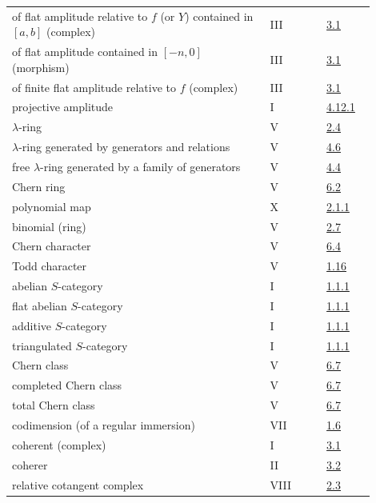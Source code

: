 \begin{longtable}{@{}>{\raggedright\arraybackslash}p{0.64\linewidth}>{\raggedright\arraybackslash}p{0.14\linewidth}>{\raggedright\arraybackslash}p{0.12\linewidth}@{}}
of flat amplitude relative to \(f\) (or \(Y\)) contained in \([a,b]\) (complex) & III & \hyperlink{sga6.e03.def.3-1}{3.1}\\
of flat amplitude contained in \([-n,0]\) (morphism) & III & \hyperlink{sga6.e03.def.3-1}{3.1}\\
of finite flat amplitude relative to \(f\) (complex) & III & \hyperlink{sga6.e03.def.3-1}{3.1}\\
projective amplitude & I & \hyperlink{sga6.e01.rem.4-12-1}{4.12.1}\\
\(\lambda\)-ring & V & \hyperlink{sga6.e05.def.2-4}{2.4}\\
\(\lambda\)-ring generated by generators and relations & V & \hyperlink{sga6.e05.def.4-6}{4.6}\\
free \(\lambda\)-ring generated by a family of generators & V & \hyperlink{sga6.e05.def.4-4}{4.4}\\
Chern ring & V & \hyperlink{sga6.e05.def.6-2}{6.2}\\
polynomial map & X & \hyperlink{sga6.e10.def.2-1-1}{2.1.1}\\
binomial (ring) & V & \hyperlink{sga6.e05.def.2-7}{2.7}\\
Chern character & V & \hyperlink{sga6.e05.def.6-4}{6.4}\\
Todd character & V & \hyperlink{sga6.e05.para.1-16}{1.16}\\
abelian \(S\)-category & I & \hyperlink{sga6.e01.para.1-1-1}{1.1.1}\\
flat abelian \(S\)-category & I & \hyperlink{sga6.e01.para.1-1-1}{1.1.1}\\
additive \(S\)-category & I & \hyperlink{sga6.e01.para.1-1-1}{1.1.1}\\
triangulated \(S\)-category & I & \hyperlink{sga6.e01.para.1-1-1}{1.1.1}\\
Chern class & V & \hyperlink{sga6.e05.para.6-7}{6.7}\\
completed Chern class & V & \hyperlink{sga6.e05.para.6-7}{6.7}\\
total Chern class & V & \hyperlink{sga6.e05.para.6-7}{6.7}\\
codimension (of a regular immersion) & VII & \hyperlink{sga6.e07.def.1-6}{1.6}\\
coherent (complex) & I & \hyperlink{sga6.e01.def.3-1}{3.1}\\
coherer & II & \hyperlink{sga6.e02.sec.3.2}{3.2}\\
relative cotangent complex & VIII & \hyperlink{sga6.e08.def.2-3}{2.3}\\

\end{longtable}
